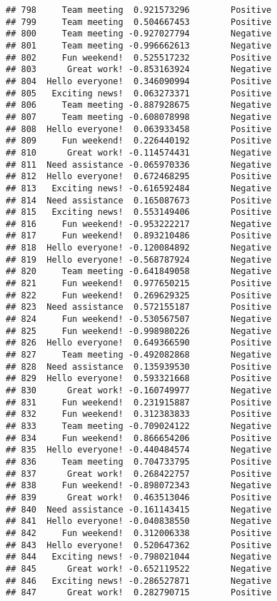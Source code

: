 \documentclass[
]{article}
\begin{document}
\begin{verbatim}
## 798     Team meeting  0.921573296        Positive
## 799     Team meeting  0.504667453        Positive
## 800     Team meeting -0.927027794        Negative
## 801     Team meeting -0.996662613        Negative
## 802     Fun weekend!  0.525517232        Positive
## 803      Great work! -0.853163924        Negative
## 804  Hello everyone!  0.346090994        Positive
## 805   Exciting news!  0.063273371        Positive
## 806     Team meeting -0.887928675        Negative
## 807     Team meeting -0.608078998        Negative
## 808  Hello everyone!  0.063933458        Positive
## 809     Fun weekend!  0.226440192        Positive
## 810      Great work! -0.114574431        Negative
## 811  Need assistance -0.065970336        Negative
## 812  Hello everyone!  0.672468295        Positive
## 813   Exciting news! -0.616592484        Negative
## 814  Need assistance  0.165087673        Positive
## 815   Exciting news!  0.553149406        Positive
## 816     Fun weekend! -0.953222217        Negative
## 817     Fun weekend!  0.893210486        Positive
## 818  Hello everyone! -0.120084892        Negative
## 819  Hello everyone! -0.568787924        Negative
## 820     Team meeting -0.641849058        Negative
## 821     Fun weekend!  0.977650215        Positive
## 822     Fun weekend!  0.269629325        Positive
## 823  Need assistance  0.572155187        Positive
## 824     Fun weekend! -0.530567507        Negative
## 825     Fun weekend! -0.998980226        Negative
## 826  Hello everyone!  0.649366590        Positive
## 827     Team meeting -0.492082868        Negative
## 828  Need assistance  0.135939530        Positive
## 829  Hello everyone!  0.593321668        Positive
## 830      Great work! -0.160749977        Negative
## 831     Fun weekend!  0.231915887        Positive
## 832     Fun weekend!  0.312383833        Positive
## 833     Team meeting -0.709024122        Negative
## 834     Fun weekend!  0.866654206        Positive
## 835  Hello everyone! -0.440484574        Negative
## 836     Team meeting  0.704733795        Positive
## 837      Great work!  0.268422757        Positive
## 838     Fun weekend! -0.898072343        Negative
## 839      Great work!  0.463513046        Positive
## 840  Need assistance -0.161143415        Negative
## 841  Hello everyone! -0.040838550        Negative
## 842     Fun weekend!  0.312006338        Positive
## 843  Hello everyone!  0.520647362        Positive
## 844   Exciting news! -0.798021044        Negative
## 845      Great work! -0.652119522        Negative
## 846   Exciting news! -0.286527871        Negative
## 847      Great work!  0.282790715        Positive

\end{verbatim}
\end{document}
